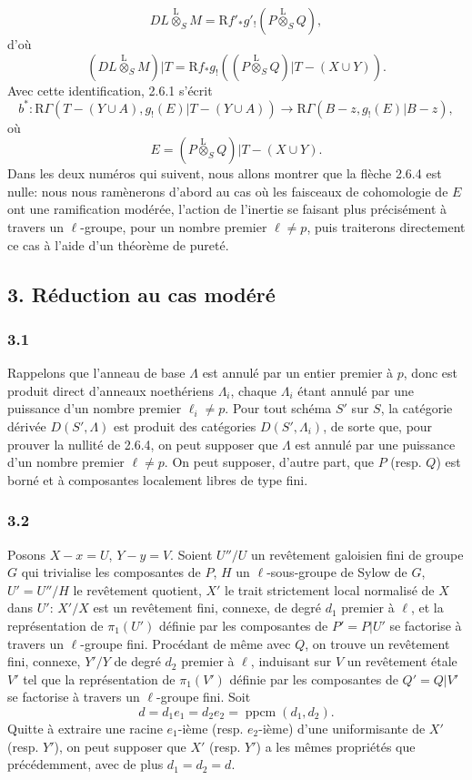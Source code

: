 \documentclass[11pt]{article}
\newcommand{\R}{\mathrm{R}}\newcommand{\RHomCore}{\mathrm{RHom}}
\providecommand{\lten}{\overset{\mathrm L}{\otimes}}
\providecommand{\lten}{\overset{\mathrm L}{\otimes}}
\providecommand{\lten}{\overset{\mathrm L}{\otimes}}
\providecommand{\R}{\mathrm R}
\providecommand{\lten}{\overset{\mathrm L}{\otimes}}
\providecommand{\lten}{\overset{\mathrm L}{\otimes}}
\providecommand{\lten}{\overset{\mathrm L}{\otimes}}
\providecommand{\lten}{\overset{\mathrm L}{\otimes}}
\begin{document}
\[
DL\lten_SM=\R f'_*g'_!(P\lten_SQ),
\]
d'où
\begin{equation}
(DL\lten_SM)|T=\R f_*g_!((P\lten_SQ)|T-(X\cup Y)).
\tag{2.6.3}
\end{equation}
Avec cette identification, 2.6.1 s'écrit
\begin{equation}
b^*:\R\Gamma(T-(Y\cup A),g_!(E)|T-(Y\cup A))
 \longrightarrow \R\Gamma(B-z,g_!(E)|B-z),
\tag{2.6.4}
\end{equation}
où
\[
E=(P\lten_SQ)|T-(X\cup Y).
\]
Dans les deux numéros qui suivent, nous allons montrer que la flèche 2.6.4 est nulle: nous nous ramènerons d'abord au cas où les faisceaux de cohomologie de $E$ ont une ramification modérée, l'action de l'inertie se faisant plus précisément à travers un $\ell$-groupe, pour un nombre premier $\ell\ne p$, puis traiterons directement ce cas à l'aide d'un théorème de pureté.

\subsection*{3. Réduction au cas modéré}

\subsubsection*{3.1}
Rappelons que l'anneau de base $\Lambda$ est annulé par un entier premier à $p$, donc est produit direct d'anneaux noethériens $\Lambda_i$, chaque $\Lambda_i$ étant annulé par une puissance d'un nombre premier $\ell_i\ne p$. Pour tout schéma $S'$ sur $S$, la catégorie dérivée $D(S',\Lambda)$ est produit des catégories $D(S',\Lambda_i)$, de sorte que, pour prouver la nullité de 2.6.4, on peut supposer que $\Lambda$ est annulé par une puissance d'un nombre premier $\ell\ne p$. On peut supposer, d'autre part, que $P$ (resp. $Q$) est borné et à composantes localement libres de type fini.

\subsubsection*{3.2}
Posons $X-x=U$, $Y-y=V$. Soient $U''/U$ un revêtement galoisien fini de groupe $G$ qui trivialise les composantes de $P$, $H$ un $\ell$-sous-groupe de Sylow de $G$, $U'=U''/H$ le revêtement quotient, $X'$ le trait strictement local normalisé de $X$ dans $U'$: $X'/X$ est un revêtement fini, connexe, de degré $d_1$ premier à $\ell$, et la représentation de $\pi_1(U')$ définie par les composantes de $P'=P|U'$ se factorise à travers un $\ell$-groupe fini. Procédant de même avec $Q$, on trouve un revêtement fini, connexe, $Y'/Y$ de degré $d_2$ premier à $\ell$, induisant sur $V$ un revêtement étale $V'$ tel que la représentation de $\pi_1(V')$ définie par les composantes de $Q'=Q|V'$ se factorise à travers un $\ell$-groupe fini. Soit
\[
d=d_1e_1=d_2e_2=\operatorname{ppcm}(d_1,d_2).
\]
Quitte à extraire une racine $e_1$-ième (resp. $e_2$-ième) d'une uniformisante de $X'$ (resp. $Y'$), on peut supposer que $X'$ (resp. $Y'$) a les mêmes propriétés que précédemment, avec de plus $d_1=d_2=d$.
\end{document}
